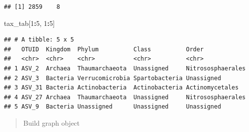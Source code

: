 \documentclass[
]{book}
\newenvironment{Shaded}{\begin{snugshade}}{\end{snugshade}}
\newcommand{\DecValTok}[1]{\textcolor[rgb]{0.00,0.00,0.81}{#1}}
\newcommand{\NormalTok}[1]{#1}
\newcommand{\SpecialCharTok}[1]{\textcolor[rgb]{0.81,0.36,0.00}{\textbf{#1}}}
\begin{document}
\begin{verbatim}
## [1] 2859    8
\end{verbatim}

\begin{Shaded}
\begin{Highlighting}[]
\NormalTok{tax\_tab[}\DecValTok{1}\SpecialCharTok{:}\DecValTok{5}\NormalTok{, }\DecValTok{1}\SpecialCharTok{:}\DecValTok{5}\NormalTok{]}
\end{Highlighting}
\end{Shaded}

\begin{verbatim}
## # A tibble: 5 x 5
##   OTUID  Kingdom  Phylum          Class          Order            
##   <chr>  <chr>    <chr>           <chr>          <chr>            
## 1 ASV_2  Archaea  Thaumarchaeota  Unassigned     Nitrososphaerales
## 2 ASV_3  Bacteria Verrucomicrobia Spartobacteria Unassigned       
## 3 ASV_31 Bacteria Actinobacteria  Actinobacteria Actinomycetales  
## 4 ASV_27 Archaea  Thaumarchaeota  Unassigned     Nitrososphaerales
## 5 ASV_9  Bacteria Unassigned      Unassigned     Unassigned
\end{verbatim}

\begin{quote}
Build graph object
\end{quote}
\end{document}
